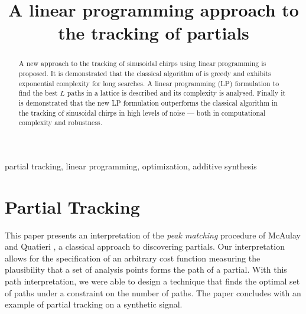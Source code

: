 \documentclass{article}
\title{A linear programming approach to the tracking of partials}
\begin{document}
\ninept
\maketitle

\begin{sloppy}

\begin{abstract}
    A new approach to the tracking of sinusoidal chirps using linear programming
    is proposed. It is demonstrated that the classical algorithm of
    \cite{mcaulay1986speech} is greedy and exhibits exponential complexity for
    long searches. A linear programming (LP) formulation to find the best $L$ paths
    in a lattice is described and its complexity is analysed. Finally it is
    demonstrated that the new LP formulation outperforms the classical algorithm
    in the tracking of sinusoidal chirps in high levels of noise --- both in
    computational complexity and robustness.
\end{abstract}

\begin{keywords}
partial tracking, linear programming, optimization, additive synthesis
\end{keywords}

\section{Partial Tracking\label{chap:partialtracking}}


This paper presents an interpretation of the \textit{peak matching} procedure
of McAulay and Quatieri \cite{mcaulay1986speech}, a classical approach to discovering partials. Our
interpretation allows for the specification of an arbitrary cost function
measuring the plausibility that a set of analysis points forms the path of a
partial. With this path interpretation, we were able to design a technique that finds the
optimal set of paths under a constraint on the number of paths. The paper 
concludes with an example of partial tracking on a synthetic signal.


\end{sloppy}
\end{document}
